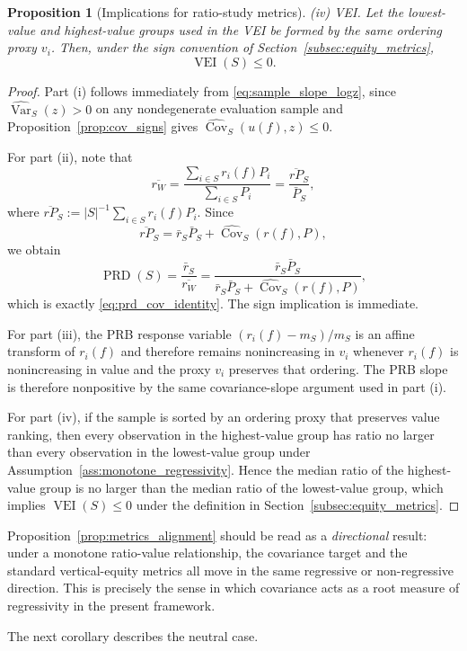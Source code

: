 \documentclass[12pt, draft]{article}
\theoremstyle{plain}
\newtheorem{proposition}{Proposition}
\theoremstyle{definition}
\newcommand{\1}{\mathbf{1}}
\begin{document}
{\begin{proposition}[Implications for ratio-study metrics]
\smallskip
\noindent
\emph{(iv) VEI.} Let the lowest-value and highest-value groups used in the VEI be formed by the same ordering proxy $v_i$. Then, under the sign convention of Section~\ref{subsec:equity_metrics},
\[
\operatorname{VEI}(S)\le 0.
\]
\end{proposition}

\begin{proof}
Part (i) follows immediately from \eqref{eq:sample_slope_logz}, since $\widehat{\operatorname{Var}}_S(z)>0$ on any nondegenerate evaluation sample and Proposition~\ref{prop:cov_signs} gives $\widehat{\operatorname{Cov}}_S(u(f),z)\le 0$.

For part (ii), note that
\[
\overline{r_W}
=
\frac{\sum_{i\in S} r_i(f)P_i}{\sum_{i\in S} P_i}
=
\frac{\overline{rP}_S}{\bar P_S},
\]
where $\overline{rP}_S:=|S|^{-1}\sum_{i\in S} r_i(f)P_i$. Since
\[
\overline{rP}_S
=
\bar r_S\bar P_S
+
\widehat{\operatorname{Cov}}_S(r(f),P),
\]
we obtain
\[
\operatorname{PRD}(S)
=
\frac{\bar r_S}{\overline{r_W}}
=
\frac{\bar r_S\bar P_S}
{\bar r_S\bar P_S+\widehat{\operatorname{Cov}}_S(r(f),P)},
\]
which is exactly \eqref{eq:prd_cov_identity}. The sign implication is immediate.

For part (iii), the PRB response variable $(r_i(f)-m_S)/m_S$ is an affine transform of $r_i(f)$ and therefore remains nonincreasing in $v_i$ whenever $r_i(f)$ is nonincreasing in value and the proxy $v_i$ preserves that ordering. The PRB slope is therefore nonpositive by the same covariance-slope argument used in part (i).

For part (iv), if the sample is sorted by an ordering proxy that preserves value ranking, then every observation in the highest-value group has ratio no larger than every observation in the lowest-value group under Assumption~\ref{ass:monotone_regressivity}. Hence the median ratio of the highest-value group is no larger than the median ratio of the lowest-value group, which implies $\operatorname{VEI}(S)\le 0$ under the definition in Section~\ref{subsec:equity_metrics}.
\end{proof}

Proposition~\ref{prop:metrics_alignment} should be read as a \emph{directional} result: under a monotone ratio-value relationship, the covariance target and the standard vertical-equity metrics all move in the same regressive or non-regressive direction. This is precisely the sense in which covariance acts as a root measure of regressivity in the present framework.

The next corollary describes the neutral case.

}
\end{document}
